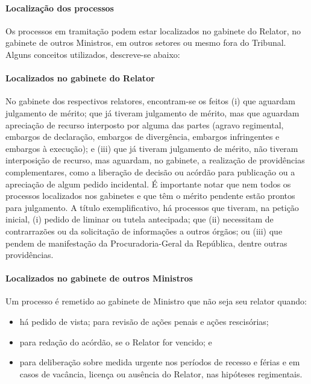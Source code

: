 \documentclass[
]{book}
\providecommand{\tightlist}{%
  \setlength{\itemsep}{0pt}\setlength{\parskip}{0pt}}
\begin{document}
\hypertarget{localizauxe7uxe3o-dos-processos}{%
\paragraph{Localização dos processos}\label{localizauxe7uxe3o-dos-processos}}

Os processos em tramitação podem estar localizados no gabinete do Relator, no gabinete de outros Ministros, em outros setores ou mesmo fora do Tribunal. Alguns conceitos utilizados, descreve-se abaixo:

\hypertarget{localizados-no-gabinete-do-relator}{%
\paragraph{Localizados no gabinete do Relator}\label{localizados-no-gabinete-do-relator}}

No gabinete dos respectivos relatores, encontram-se os feitos (i) que aguardam julgamento de mérito; que já tiveram julgamento de mérito, mas que aguardam apreciação de recurso interposto por alguma das partes (agravo regimental, embargos de declaração, embargos de divergência, embargos infringentes e embargos à execução); e (iii) que já tiveram julgamento de mérito, não tiveram interposição de recurso, mas aguardam, no gabinete, a realização de providências complementares, como a liberação de decisão ou acórdão para publicação ou a apreciação de algum pedido incidental.
É importante notar que nem todos os processos localizados nos gabinetes e que têm o mérito pendente estão prontos para julgamento. A título exemplificativo, há processos que tiveram, na petição inicial, (i) pedido de liminar ou tutela antecipada; que (ii) necessitam de contrarrazões ou da solicitação de informações a outros órgãos; ou (iii) que pendem de manifestação da Procuradoria-Geral da República, dentre outras providências.

\hypertarget{localizados-no-gabinete-de-outros-ministros}{%
\paragraph{Localizados no gabinete de outros Ministros}\label{localizados-no-gabinete-de-outros-ministros}}

Um processo é remetido ao gabinete de Ministro que não seja seu relator quando:

\begin{itemize}
\tightlist
\item
  há pedido de vista; para revisão de ações penais e ações rescisórias;
\item
  para redação do acórdão, se o Relator for vencido; e
\item
  para deliberação sobre medida urgente nos períodos de recesso e férias e em casos de vacância, licença ou ausência do Relator, nas hipóteses regimentais.
\end{itemize}
\end{document}
